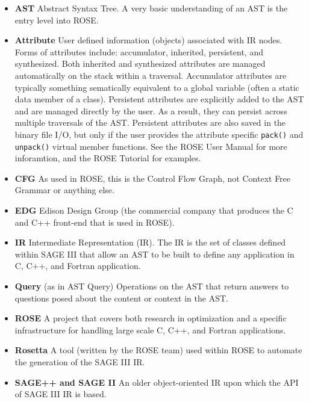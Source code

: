 \begin{itemize}
   \item {\bf AST} Abstract Syntax Tree. A very basic understanding of an AST is the
                   entry level into ROSE.

   \item {\bf Attribute} User defined information (objects) associated with IR nodes.
    Forms of attributes include: accumulator, inherited, persistent, and synthesized.
    Both inherited and synthesized attributes are managed automatically on the stack within a
    traversal.  Accumulator attributes are typically something sematically equivalent to a
    global variable (often a static data member of a class).  Persistent attributes 
    are explicitly added to the AST and are managed directly by the user.  As a result,
    they can persist across multiple traversals of the AST.  Persistent attributes are
    also saved in the binary file I/O, but only if the user provides the attribute
    specific {\tt pack()} and {\tt unpack()} virtual member functions.  See the ROSE
    User Manual for more inforamtion, and the ROSE Tutorial for examples.

   \item {\bf CFG} As used in ROSE, this is the Control Flow Graph, not Context Free
    Grammar or anything else.

   \item {\bf EDG} Edison Design Group (the commercial company that produces the C and C++
    front-end that is used in ROSE).

   \item {\bf IR} Intermediate Representation (IR).  The IR is the set of classes defined
    within SAGE III that allow an AST to be built to define any application in C, C++,
    and Fortran application.

   \item {\bf Query} (as in AST Query) Operations on the AST that return answers to
    questions posed about the content or context in the AST.

   \item {\bf ROSE} A project that covers both research in optimization and a specific
    infrastructure for handling large scale C, C++, and Fortran applications.

   \item {\bf Rosetta} A tool (written by the ROSE team) used within ROSE to automate the
    generation of the SAGE III IR.

   \item {\bf SAGE++ and SAGE II} An older object-oriented IR upon which the API of 
   SAGE III IR is based.


\end{itemize}

